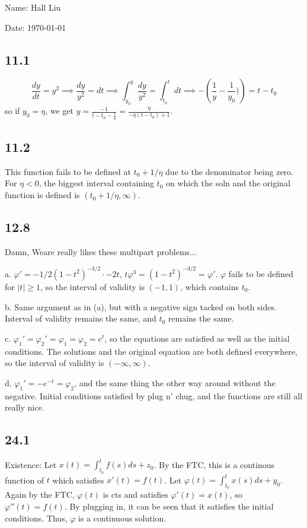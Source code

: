\documentclass{article}
\begin{document}
Name: Hall Liu

Date: \today 
\vspace{1.5cm}

\subsection*{11.1}
$$\frac{dy}{dt}=y^2\implies\frac{dy}{y^2}=dt\implies\int_{y_0}^y\frac{dy}{y^2}=\int_{t_0}^tdt\implies-\left(\frac{1}{y}-\frac{1}{y_0})\right)=t-t_0$$ so if $y_0=\eta$, we get $y=\frac{-1}{t-t_0-\frac{1}{\eta}}=\frac{\eta}{-\eta(t-t_0)+1}$.
\subsection*{11.2}
This function fails to be defined at $t_0+1/\eta$ due to the denominator being zero. For $\eta<0$, the biggest interval containing $t_0$ on which the soln and the original function is defined is $(t_0+1/\eta,\infty)$.
\subsection*{12.8}
Damn, Weare really likes these multipart problems...

a. $\varphi'=-1/2(1-t^2)^{-3/2}\cdot-2t$, $t\varphi^3=(1-t^2)^{-3/2}=\varphi'$. $\varphi$ fails to be defined for $|t|\geq1$, so the interval of validity is $(-1,1)$, which contains $t_0$. 

b. Same argument as in (a), but with a negative sign tacked on both sides. Interval of validity remains the same, and $t_0$ remains the same.

c. $\varphi_1'=\varphi_2'=\varphi_1=\varphi_2=e^t$, so the equations are satisfied as well as the initial conditions. The solutions and the original equation are both defined everywhere, so the interval of validity is $(-\infty,\infty)$. 

d. $\varphi_1'=-e^{-t}=\varphi_2$, and the same thing the other way around without the negative. Initial conditions satisfied by plug n' chug, and the functions are still all really nice.
\subsection*{24.1}
Existence: Let $x(t)=\int_{t_0}^tf(s)ds+z_0$. By the FTC, this is a continous function of $t$ which satisfies $x'(t)=f(t)$. Let $\varphi(t)=\int_{t_0}^tx(s)ds+y_0$. Again by the FTC, $\varphi(t)$ is cts and satisfies $\varphi'(t)=x(t)$, so $\varphi''(t)=f(t)$. By plugging in, it can be seen that it satisfies the initial conditions. Thus, $\varphi$ is a continuous solution. 
\end{document}

